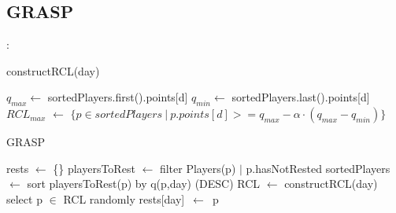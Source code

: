 \documentclass[9pt, aspectratio=169, xcolor=table]{beamer}
\begin{document}
\subsection{GRASP}
\begin{frame}{\secname: \subsecname}
\begin{algorithm}[H]
    \caption{constructRCL(day)} 
    \label{rcl}
    \begin{algorithmic}[1]
	\State $q_{max} \leftarrow $ sortedPlayers.first().points[d]
	\State $q_{min} \leftarrow$ sortedPlayers.last().points[d]
	\State $RCL_{max}$ $\leftarrow$ $\{p \in sortedPlayers\ |\ p.points[d] >= q_{max} - \alpha \cdot (q_{max} - q_{min})\}$
    \end{algorithmic} 
\end{algorithm}




\begin{algorithm}[H]
	\caption{GRASP} 
	\begin{algorithmic}[1]
	  \State rests $\leftarrow$ \{\}
        \State playersToRest $\leftarrow$ filter Players(p) $|$ p.hasNotRested
        \State sortedPlayers $\leftarrow$ sort playersToRest(p) by q(p,day) (DESC)
	      \State RCL $\leftarrow$ constructRCL(day)
	      \State select p $\in$ RCL randomly
	      \State rests[day]\ $\leftarrow$\ p
	    \EndFor
	\end{algorithmic} 
\end{algorithm}
\end{frame}
\end{document}
